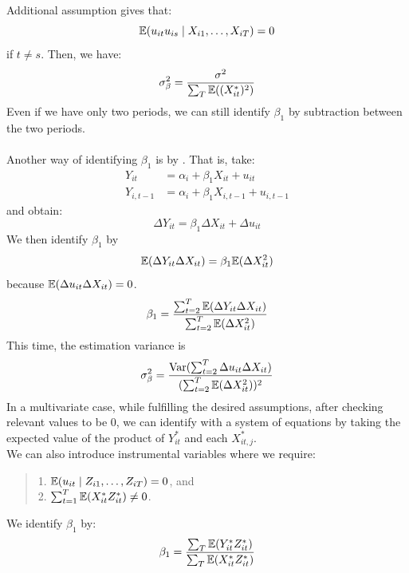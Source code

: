Additional  assumption gives that:
$$\mathbb{E}(u_{it}u_{is} \mid X_{i1}, \dots, X_{iT}) = 0$$
if $t \ne s$. Then, we have:
$$\sigma_\beta^2 = \frac{\sigma^2}{\sum_{T}\mathbb{E}((X_{it}^*)^2)}$$
Even if we have only two periods, we can still identify $\beta_1$ by subtraction between the two periods. \\
\bigskip \\
Another way of identifying $\beta_1$ is by . That is, take:
\begin{align*}
    Y_{it} &= \alpha_i + \beta_1 X_{it} + u_{it} \\
    Y_{i,t-1} &= \alpha_i + \beta_1 X_{i,t-1} + u_{i,t-1}
\end{align*}
and obtain:
$$\Delta Y_{it} = \beta_1 \Delta X_{it} + \Delta u_{it}$$
We then identify $\beta_1$ by
$$\mathbb{E}(\Delta Y_{it} \Delta X_{it}) = \beta_1 \mathbb{E}(\Delta X_{it}^2)$$
because $\mathbb{E}(\Delta u_{it} \Delta X_{it}) = 0$.
$$\beta_1 = \frac{\sum_{t = 2}^{T} \mathbb{E}(\Delta Y_{it} \Delta X_{it})}{\sum_{t =2}^{T} \mathbb{E}(\Delta X_{it}^2)}$$
This time, the estimation variance is
$$\sigma_\beta^2 = \frac{\text{Var}(\sum_{t = 2}^{T} \Delta u_{it} \Delta X_{it})}{(\sum_{t =2}^{T} \mathbb{E}(\Delta X_{it}^2))^2}$$
In a multivariate case, while fulfilling the desired assumptions, after checking relevant values to be $0$, we can identify with a system of equations by taking the expected value of the product of $Y_{it}^*$ and each $X_{it, j}^*$. \\
We can also introduce instrumental variables where we require:
\begin{quote}
    1. $\mathbb{E}(u_{it} \mid Z_{i1}, \dots, Z_{iT}) = 0$, and \\
    2. $\sum_{t = 1}^{T} \mathbb{E}(X_{it}^*Z_{it}^*) \ne 0$.
\end{quote}
We identify $\beta_1$ by:
$$\beta_1 = \frac{\sum_{T} \mathbb{E}(Y_{it}^*Z_{it}^*)}{\sum_{T} \mathbb{E}(X_{it}^* Z_{it}^*)}$$

\newpage